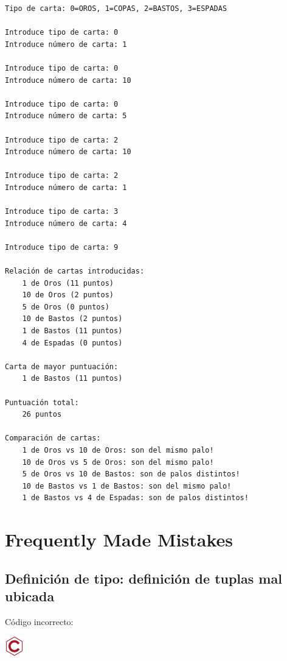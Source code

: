 \documentclass[
]{book}
\begin{document}
\begin{verbatim}
Tipo de carta: 0=OROS, 1=COPAS, 2=BASTOS, 3=ESPADAS

Introduce tipo de carta: 0  
Introduce número de carta: 1

Introduce tipo de carta: 0
Introduce número de carta: 10

Introduce tipo de carta: 0
Introduce número de carta: 5

Introduce tipo de carta: 2 
Introduce número de carta: 10

Introduce tipo de carta: 2
Introduce número de carta: 1

Introduce tipo de carta: 3
Introduce número de carta: 4

Introduce tipo de carta: 9

Relación de cartas introducidas: 
    1 de Oros (11 puntos) 
    10 de Oros (2 puntos) 
    5 de Oros (0 puntos) 
    10 de Bastos (2 puntos) 
    1 de Bastos (11 puntos) 
    4 de Espadas (0 puntos) 

Carta de mayor puntuación: 
    1 de Bastos (11 puntos) 

Puntuación total: 
    26 puntos 

Comparación de cartas: 
    1 de Oros vs 10 de Oros: son del mismo palo!
    10 de Oros vs 5 de Oros: son del mismo palo!
    5 de Oros vs 10 de Bastos: son de palos distintos!
    10 de Bastos vs 1 de Bastos: son del mismo palo!
    1 de Bastos vs 4 de Espadas: son de palos distintos!
\end{verbatim}

\hypertarget{frequently-made-mistakes-4}{%
\section{Frequently Made Mistakes}\label{frequently-made-mistakes-4}}

\hypertarget{definiciuxf3n-de-tipo-definiciuxf3n-de-tuplas-mal-ubicada}{%
\subsection{Definición de tipo: definición de tuplas mal ubicada}\label{definiciuxf3n-de-tipo-definiciuxf3n-de-tuplas-mal-ubicada}}

Código incorrecto:

\includegraphics{./img/c_err.png}
\end{document}
